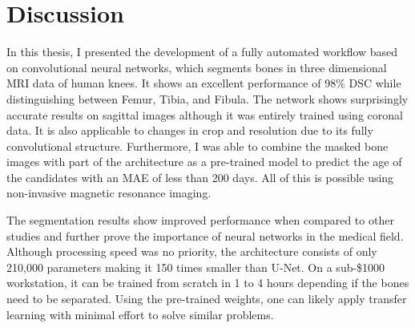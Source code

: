 \section{Discussion}

In this thesis, I presented the development of a fully automated workflow based on convolutional neural networks, which segments bones in three dimensional MRI data of human knees. It shows an excellent performance of 98\% DSC while distinguishing between Femur, Tibia, and Fibula. The network shows surprisingly accurate results on sagittal images although it was entirely trained using coronal data. It is also applicable to changes in crop and resolution due to its fully convolutional structure. Furthermore, I was able to combine the masked bone images with part of the architecture as a pre-trained model to predict the age of the candidates with an MAE of less than 200 days. All of this is possible using non-invasive magnetic resonance imaging.

The segmentation results show improved performance when compared to other studies and further prove the importance of neural networks in the medical field. Although processing speed was no priority, the architecture consists of only 210,000 parameters making it 150 times smaller than U-Net. On a sub-\$1000 workstation, it can be trained from scratch in 1 to 4 hours depending if the bones need to be separated. Using the pre-trained weights, one can likely apply transfer learning with minimal effort to solve similar problems.

\newpage